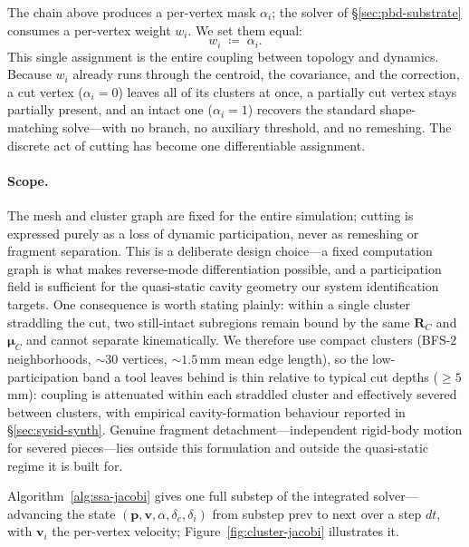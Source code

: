 \documentclass[letterpaper, 10 pt, conference]{ieeeconf}  %
\theoremstyle{tight}
\begin{document}
The chain above produces a per-vertex mask $\alpha_i$; the solver of
\S\ref{sec:pbd-substrate} consumes a per-vertex weight $w_i$. We set
them equal:
\begin{equation}
  w_i \;\coloneqq\; \alpha_i.
  \label{eq:bridge}
\end{equation}
This single assignment is the entire coupling between topology and
dynamics. Because $w_i$ already runs through the centroid, the
covariance, and the correction, a cut vertex ($\alpha_i=0$) leaves all
of its clusters at once, a partially cut vertex stays partially
present, and an intact one ($\alpha_i=1$) recovers the standard
shape-matching solve---with no branch, no auxiliary threshold, and no
remeshing. The discrete act of cutting has become one differentiable
assignment.
 
\paragraph{Scope.} The mesh and cluster graph are fixed for the entire
simulation; cutting is expressed purely as a loss of dynamic
participation, never as remeshing or fragment separation. This is a
deliberate design choice---a fixed computation graph is what makes
reverse-mode differentiation possible, and a participation field is
sufficient for the quasi-static cavity geometry our system
identification targets. One consequence is worth stating plainly: within
a single cluster straddling the cut, two still-intact subregions remain
bound by the same $\mathbf{R}_C$ and $\boldsymbol{\mu}_C$ and cannot
separate kinematically. We therefore use compact clusters (BFS-$2$
neighborhoods, ${\sim}30$ vertices, ${\sim}1.5$\,mm mean edge length),
so the low-participation band a tool leaves behind is thin relative to
typical cut depths ($\geq5$\,mm): coupling is attenuated within each
straddled cluster and effectively severed between clusters, with
empirical cavity-formation behaviour reported in
\S\ref{sec:sysid-synth}. Genuine fragment detachment---independent
rigid-body motion for severed pieces---lies outside this formulation
and outside the quasi-static regime it is built for.
 
Algorithm~\ref{alg:ssa-jacobi} gives one full substep of the integrated
solver---advancing the state
$(\mathbf{p},\mathbf{v},\alpha,\delta_e,\delta_i)$ from substep
$\mathrm{prev}$ to $\mathrm{next}$ over a step $dt$, with $\mathbf{v}_i$
the per-vertex velocity; Figure~\ref{fig:cluster-jacobi} illustrates it.
 
\end{document}
